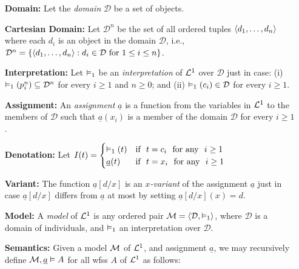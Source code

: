 \documentclass[a4paper, 11pt]{article} %
\begin{document}
\begin{enumerate}[leftmargin=1.2in] %
	\item[\bf Domain:] Let the \textit{domain} $\mathcal{D}$ be a set of objects.%
	\item[\bf Cartesian Domain:] Let $\mathcal{D}^n$ be the set of all ordered tuples $\langle d_1,\dots,d_n\rangle$ where each $d_i$ is an object in the domain $\mathcal{D}$, i.e., $\mathcal{D}^n=\lbrace\langle d_1,\dots,d_n\rangle:d_i\in\mathcal{D}~\text{for}~1\leq i\leq n\rbrace$.
	\item[\bf Interpretation:] Let $\vDash_1$ be an \textit{interpretation} of $\mathcal{L}^1$ over $\mathcal{D}$ just in case: (i) $\vDash_1(p_i^n)\subseteq\mathcal{D}^n$ for every $i\geq1$ and $n\geq0$; and (ii) $\vDash_1(c_i)\in\mathcal{D}$ for every $i\geq1$.
	\item[\bf Assignment:] An \textit{assignment} $\underline{a}$ is a function from the variables in $\mathcal{L}^1$ to the members of $\mathcal{D}$ such that $\underline{a}(x_i)$ is a member of the domain $\mathcal{D}$ for every $i\geq1$.
	\item[\bf Denotation:] Let $I(t)=
		      \begin{cases}
			      \vDash_1(t)     & \text{if}~~ t=c_i ~~\text{for any}~~ i\geq1 \\
			      \underline{a}(t) & \text{if}~~ t=x_i ~~\text{for any}~~ i\geq1
		      \end{cases}$
	\item[\bf Variant:] The function $\underline{a}[d/x]$ is an \textit{$x$-variant} of the assignment $\underline{a}$ just in case $\underline{a}[d/x]$ differs from $\underline{a}$ at most by setting $\underline{a}[d/x](x)=d$.
	\item[\bf Model:] A \textit{model} of $\mathcal{L}^1$ is any ordered pair $\mathcal{M}=\langle\mathcal{D},\vDash_1\rangle$, where $\mathcal{D}$ is a domain of individuals, and $\vDash_1$ an interpretation over $\mathcal{D}$.
	\item[\bf Semantics:] Given a model $\mathcal{M}$ of $\mathcal{L}^1$, and assignment $\underline{a}$, we may recursively define $\mathcal{M},\underline{a}\vDash A$ for all wfss $A$ of $\mathcal{L}^1$ as follows:
	      \begin{small}

\end{small}
\end{enumerate}
\end{document}
